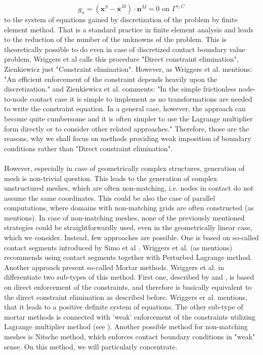 \documentclass{article}
\newcommand{\beq}{\begin{equation}}
\newcommand{\eeq}{\end{equation}}
\begin{document}
\beq
g_{n}=\left(\mathbf{x}^{S}-\overline{\mathbf{x}}^{M}\right) \cdot \mathbf{n}^{M} = 0 \text{ on } \Gamma^{\gamma,C}
\nonumber
\eeq  
to the system of equations gained by discretization of the problem by finite element method. That is a standard practice in finite element analysis and leads to the reduction of the number of the unknowns of the problem. This is theoretically possible to do even in case of discretized contact boundary value problem, Wriggers et al \cite[Chapter 5, p.104]{Wriggers} calls this procedure "Direct constraint elimination", Zienkiewicz \cite[Chapter 7, p.195]{Zienkiewicz2} just "Constraint elimination". However, as Wriggers et al. \cite[Chapter 5, p.104]{Wriggers} mentions: "An efficient enforcement of the constraint depends heavily upon the discretization." and Zienkiewicz et al. \cite[Chapter 7, p.195]{Zienkiewicz2} comments: "In the simple frictionless node-to-node contact case it is simple to implement as no transformations are needed to write the constraint equation. In a general case, however, the approach can become quite cumbersome and it is often simpler to use the Lagrange multiplier form directly or to consider other related approaches." Therefore, those are the reasons, why we shall focus on methods providing weak imposition of boundary conditions rather than "Direct constraint elimination".  
\\
\\
However, especially in case of geometrically complex structures, generation of mesh is non-trivial question. This leads to the generation of complex unstructured meshes, which are often non-matching, i.e. nodes in contact do not assume the same coordinates. This could be also the case of parallel computations, where domains with non-matching grids are often constructed (as \cite[Chapter 7, p.183]{Wriggers} mentions). In case of non-matching meshes, none of the previously mentioned strategies could be straightforwardly used, even in the geometrically linear case, which we consider. Instead, few approaches are possible. One is based on so-called contact segments introduced by Simo et al \cite{Simo}.  Wriggers et al. (as \cite[Chapter 7, p.183]{Wriggers} mentions) recommends using contact segments together with Perturbed Lagrange method. Another approach present so-called Mortar methods. Wriggers et al. in \cite[Chapter 7, p.188-189]{Wriggers} differentiate two sub-types of this method. First one, described by \cite{Bernadi}and \cite{Wohlmuth}, is based on direct enforcement of the constraints, and therefore is basically equivalent to the direct constraint elimination as described before. Wriggers er al. \cite[Chapter 7, p.189]{Wriggers} mentions, that it leads to a positive definite system of equations. The other sub-type of mortar methods is connected with 'weak' enforcement of the constraints utilizing Lagrange multiplier method (see \cite{Wohlmuth}). Another possible method for non-matching meshes is Nitsche method, which enforces contact boundary conditions in "weak" sense. On this method, we will particularly concentrate.
\end{document}

